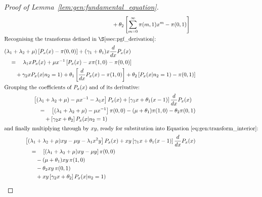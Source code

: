 \begin{proof}[Proof of Lemma~\ref{lem:gen:fundamental_equation}]
\begin{align}
\begin{split}
            & \quad \quad + \theta_2 \left[ \sum_{m=0}^{\infty} \pi(m, 1) x^{m} - \pi(0, 1) \right]
        \end{split} \nonumber \\
        \intertext{Recognising the transforms defined in \S\ref{ssec:pgf_derivation}:}
        \begin{split}
            & (\lambda_1 + \lambda_2 + \mu) \left[ P_x(x) - \pi(0,0) \right]
            + (\gamma_1 + \theta_1) x \frac{d}{dx} P_x(x) \\
            & \quad = \quad \lambda_1 x P_x(x)
            + \mu x^{-1} \left[ P_x(x) - x \pi(1, 0) - \pi(0, 0) \right] \\
            & \quad \quad + \gamma_2 x P_x(x | n_2=1)
            + \theta_1 \left[ \frac{d}{dx} P_x(x) - \pi(1, 0) \right]
            + \theta_2 \left[ P_x(x | n_2=1) - \pi(0, 1) \right]
        \end{split} \nonumber \\
        \intertext{Grouping the coefficients of $P_x(x)$ and of its derivative:}
        \begin{split}
            & \left[ (\lambda_1 + \lambda_2 + \mu) - \mu x^{-1} - \lambda_1 x \right] P_x(x)
            + \left[ \gamma_1 x + \theta_1(x-1) \right] \frac{d}{dx} P_x(x) \\
            & \quad = \quad \left[ (\lambda_1 + \lambda_2 + \mu) - \mu x^{-1} \right] \pi(0,0)
            - (\mu + \theta_1) \pi(1, 0)
            - \theta_2 \pi(0, 1) \\
            & \quad \quad + \left[ \gamma_2 x + \theta_2 \right] P_x(x | n_2=1)
        \end{split} \nonumber \\
        \intertext{and finally multiplying through by $xy$, ready for substitution into Equation~\eqref{eq:gen:transform_interior}:}
        \begin{split}
            & \left[ (\lambda_1 + \lambda_2 + \mu)xy - \mu y - \lambda_1 x^2 y \right] P_x(x)
            + xy \left[ \gamma_1 x + \theta_1(x-1) \right] \frac{d}{dx} P_x(x) \\
            & \quad = \quad \left[ (\lambda_1 + \lambda_2 + \mu)xy - \mu y \right] \pi(0,0) \\
            & \quad \quad - (\mu + \theta_1) xy \, \pi(1, 0) \\
            & \quad \quad - \theta_2 xy \, \pi(0, 1) \\
            & \quad \quad + xy \left[ \gamma_2 x + \theta_2 \right] P_x(x | n_2=1)
        \end{split} \label{eq:gen:transform_x_boundary}
    \end{align}
    

\end{proof}
